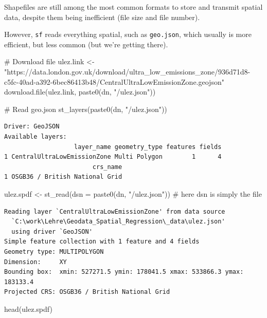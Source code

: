 \documentclass[
  letterpaper,
  DIV=11,
  numbers=noendperiod]{scrreprt}
\newenvironment{Shaded}{\begin{snugshade}}{\end{snugshade}}
\newcommand{\AttributeTok}[1]{\textcolor[rgb]{0.40,0.45,0.13}{#1}}
\newcommand{\CommentTok}[1]{\textcolor[rgb]{0.37,0.37,0.37}{#1}}
\newcommand{\FunctionTok}[1]{\textcolor[rgb]{0.28,0.35,0.67}{#1}}
\newcommand{\NormalTok}[1]{\textcolor[rgb]{0.00,0.23,0.31}{#1}}
\newcommand{\OtherTok}[1]{\textcolor[rgb]{0.00,0.23,0.31}{#1}}
\newcommand{\StringTok}[1]{\textcolor[rgb]{0.13,0.47,0.30}{#1}}
\begin{document}
Shapefiles are still among the most common formats to store and transmit
spatial data, despite them being inefficient (file size and file
number).

However, \texttt{sf} reads everything spatial, such as
\texttt{geo.json}, which usually is more efficient, but less common (but
we're getting there).

\begin{Shaded}
\begin{Highlighting}[]
\CommentTok{\# Download file}
\NormalTok{ulez.link }\OtherTok{\textless{}{-}} \StringTok{"https://data.london.gov.uk/download/ultra\_low\_emissions\_zone/936d71d8{-}c5fc{-}40ad{-}a392{-}6bec86413b48/CentralUltraLowEmissionZone.geojson"}
\FunctionTok{download.file}\NormalTok{(ulez.link, }\FunctionTok{paste0}\NormalTok{(dn, }\StringTok{"/ulez.json"}\NormalTok{))}

\CommentTok{\# Read geo.json}
\FunctionTok{st\_layers}\NormalTok{(}\FunctionTok{paste0}\NormalTok{(dn, }\StringTok{"/ulez.json"}\NormalTok{))}
\end{Highlighting}
\end{Shaded}

\begin{verbatim}
Driver: GeoJSON 
Available layers:
                   layer_name geometry_type features fields
1 CentralUltraLowEmissionZone Multi Polygon        1      4
                        crs_name
1 OSGB36 / British National Grid
\end{verbatim}

\begin{Shaded}
\begin{Highlighting}[]
\NormalTok{ulez.spdf }\OtherTok{\textless{}{-}} \FunctionTok{st\_read}\NormalTok{(}\AttributeTok{dsn =} \FunctionTok{paste0}\NormalTok{(dn, }\StringTok{"/ulez.json"}\NormalTok{)) }\CommentTok{\# here dsn is simply the file}
\end{Highlighting}
\end{Shaded}

\begin{verbatim}
Reading layer `CentralUltraLowEmissionZone' from data source 
  `C:\work\Lehre\Geodata_Spatial_Regression\_data\ulez.json' 
  using driver `GeoJSON'
Simple feature collection with 1 feature and 4 fields
Geometry type: MULTIPOLYGON
Dimension:     XY
Bounding box:  xmin: 527271.5 ymin: 178041.5 xmax: 533866.3 ymax: 183133.4
Projected CRS: OSGB36 / British National Grid
\end{verbatim}

\begin{Shaded}
\begin{Highlighting}[]
\FunctionTok{head}\NormalTok{(ulez.spdf)}
\end{Highlighting}
\end{Shaded}
\end{document}
